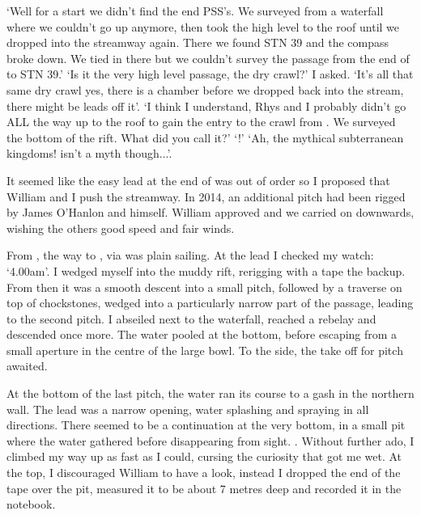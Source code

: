 `Well for a start we didn't find the end PSS's. We surveyed from a waterfall where we couldn't go up anymore, then took the high level to the roof until we dropped into the streamway again. There we found  STN 39 and the compass broke down. We tied in there but we couldn't survey the passage from the end of  to STN 39.'
`Is it the very high level passage, the dry crawl?' I asked.
`It's all that same dry crawl yes, there is a chamber before we dropped back into the stream, there might be leads off it'.
`I think I understand, Rhys and I probably didn't go ALL the way up to the roof to gain the entry to the crawl from . We surveyed the bottom of the rift. What did you call it?'
`!'
`Ah, the mythical subterranean kingdoms!  isn't a myth though...'.

\mydelimiter

It seemed like the easy lead at the end of  was out of order so I proposed that William and I push the  streamway. In 2014, an additional pitch had been rigged by James O'Hanlon and himself. William approved and we carried on downwards, wishing the others good speed and fair winds.

From , the way to , via  was plain sailing. At the lead I checked my watch: `4.00am'. I wedged myself into the muddy rift, rerigging with a tape the backup. From then it was a smooth descent into a small pitch, followed by a traverse on top of chockstones, wedged into a particularly narrow part of the passage, leading to the second pitch. I abseiled next to the waterfall, reached a rebelay and descended once more. The water pooled at the bottom, before escaping from a small aperture in the centre of the large bowl. To the side, the take off for  pitch awaited.

At the bottom of the last pitch, the water ran its course to a gash in the northern wall. The lead was a narrow opening, water splashing and spraying in all directions. There seemed to be a continuation at the very bottom, in a small pit where the water gathered before disappearing from sight. . Without further ado, I climbed my way up as fast as I could, cursing the curiosity that got me wet. At the top, I discouraged William to have a look, instead I dropped the end of the tape over the pit, measured it to be about 7 metres deep and recorded it in the notebook.

